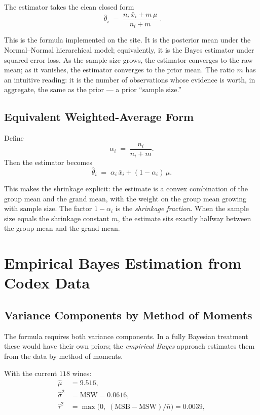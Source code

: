 \documentclass[11pt]{article}
\begin{document}
The estimator takes the clean closed form
\[
    \boxed{\;\hat{\theta}_i \;=\; \frac{n_i\,\bar{x}_i + m\,\mu}{n_i + m}\;}.
\]

This is the formula implemented on the site. It is the posterior mean
under the Normal--Normal hierarchical model; equivalently, it is the
Bayes estimator under squared-error loss. As the sample size grows, the
estimator converges to the raw mean; as it vanishes, the estimator
converges to the prior mean. The ratio $m$ has an intuitive reading: it
is the number of observations whose evidence is worth, in aggregate, the
same as the prior --- a prior ``sample size.''

\subsection{Equivalent Weighted-Average Form}

Define
\[
    \alpha_i \;=\; \frac{n_i}{n_i + m}.
\]
Then the estimator becomes
\[
    \hat{\theta}_i \;=\; \alpha_i\,\bar{x}_i + (1 - \alpha_i)\,\mu.
\]

This makes the shrinkage explicit: the estimate is a convex combination
of the group mean and the grand mean, with the weight on the group mean
growing with sample size. The factor $1 - \alpha_i$ is the
\emph{shrinkage fraction}. When the sample size equals the shrinkage
constant $m$, the estimate sits exactly halfway between the group mean
and the grand mean.

\section{Empirical Bayes Estimation from Codex Data}

\subsection{Variance Components by Method of Moments}

The formula requires both variance components. In a fully Bayesian
treatment these would have their own priors; the \emph{empirical Bayes}
approach estimates them from the data by method of moments.

With the current $118$ wines:
\begin{align*}
    \hat{\mu}      &= 9.516, \\
    \hat{\sigma}^2 &= \mathrm{MSW} = 0.0616, \\
    \hat{\tau}^2   &= \max\!\bigl(0,\; (\mathrm{MSB} - \mathrm{MSW}) / \bar{n}\bigr) = 0.0039,
\end{align*}
\end{document}
